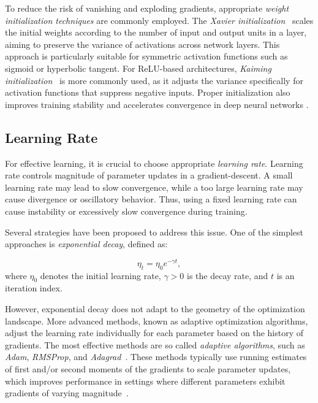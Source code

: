 To reduce the risk of vanishing and exploding gradients, appropriate \emph{weight initialization techniques} are commonly employed. The \emph{Xavier initialization}~\cite{glorot2010} scales the initial weights according to the number of input and output units in a layer, aiming to preserve the variance of activations across network layers. This approach is particularly suitable for symmetric activation functions such as sigmoid or hyperbolic tangent. For ReLU-based architectures, \emph{Kaiming initialization}~\cite{he2015} is more commonly used, as it adjusts the variance specifically for activation functions that suppress negative inputs. Proper initialization also improves training stability and accelerates convergence in deep neural networks \cite{glorot2010,he2015}.

\subsection{Learning Rate}

For effective learning, it is crucial to choose appropriate \emph{learning rate}. Learning rate controls magnitude of parameter updates in a gradient-descent. A small learning rate may lead to slow convergence, while a too large learning rate may cause divergence or oscillatory behavior. Thus, using a fixed learning rate can cause instability or excessively slow convergence during training. 

Several strategies have been proposed to address this issue. One of the simplest approaches is \textit{exponential decay}, defined as:

\begin{equation*}
    \eta_t = \eta_0 e^{-\gamma t},
\end{equation*}
where $\eta_0$ denotes the initial learning rate, $\gamma>0$ is the decay rate, and $t$ is an iteration index. 

However, exponential decay does not adapt to the geometry of the optimization landscape. More advanced methods, known as adaptive optimization algorithms, adjust the learning rate individually for each parameter based on the history of gradients. The most effective methods are so called \emph{adaptive algorithms}, such as \textit{Adam}, \textit{RMSProp}, and \textit{Adagrad}~\cite{ruder2016overview, duchi2011adaptive, kingma2015adam}. These methods typically use running estimates of first and/or second moments of the gradients to scale parameter updates, which improves performance in settings where different parameters exhibit gradients of varying magnitude~\cite{ruder2016overview}. 

